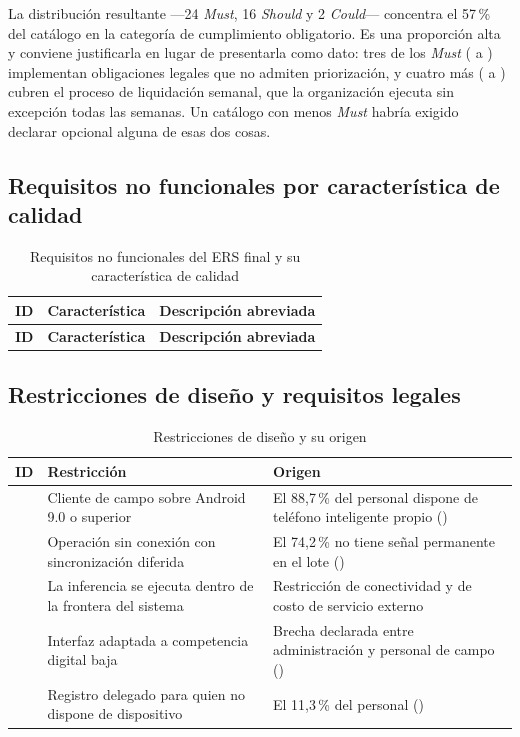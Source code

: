 \noindent
La distribución resultante ---24 \emph{Must}, 16 \emph{Should} y 2 \emph{Could}--- concentra el
57\,\% del catálogo en la categoría de cumplimiento obligatorio. Es una proporción alta y conviene
justificarla en lugar de presentarla como dato: tres de los \emph{Must} ( a )
implementan obligaciones legales que no admiten priorización, y cuatro más ( a )
cubren el proceso de liquidación semanal, que la organización ejecuta sin excepción todas las
semanas. Un catálogo con menos \emph{Must} habría exigido declarar opcional alguna de esas dos cosas.

\subsection{Requisitos no funcionales por característica de calidad}

\begin{longtable}{|M{1.8cm}|L{3.6cm}|L{8.4cm}|}
\caption{Requisitos no funcionales del ERS final y su característica de calidad}
\label{tab:rnf-completo}\\
\hline
{}\textbf{ID} & \textbf{Característica} & \textbf{Descripción abreviada}\\ \hline
\endfirsthead
\hline
{}\textbf{ID} & \textbf{Característica} & \textbf{Descripción abreviada}\\ \hline
\endhead

\end{longtable}

\subsection{Restricciones de diseño y requisitos legales}

\begin{table}[H]
\centering\footnotesize
\caption{Restricciones de diseño y su origen}
\label{tab:rd}
\begin{tabular}{|C{1.6cm}|L{6.8cm}|L{6.2cm}|}
\hline
{}\textbf{ID} & \textbf{Restricción} & \textbf{Origen}\\ \hline
{} & Cliente de campo sobre Android 9.0 o superior & El 88,7\,\% del personal dispone de teléfono inteligente propio ()\\ \hline
{} & Operación sin conexión con sincronización diferida & El 74,2\,\% no tiene señal permanente en el lote ()\\ \hline
{} & La inferencia se ejecuta dentro de la frontera del sistema & Restricción de conectividad y de costo de servicio externo\\ \hline
{} & Interfaz adaptada a competencia digital baja & Brecha declarada entre administración y personal de campo ()\\ \hline
{} & Registro delegado para quien no dispone de dispositivo & El 11,3\,\% del personal ()\\ \hline
\end{tabular}
\end{table}


